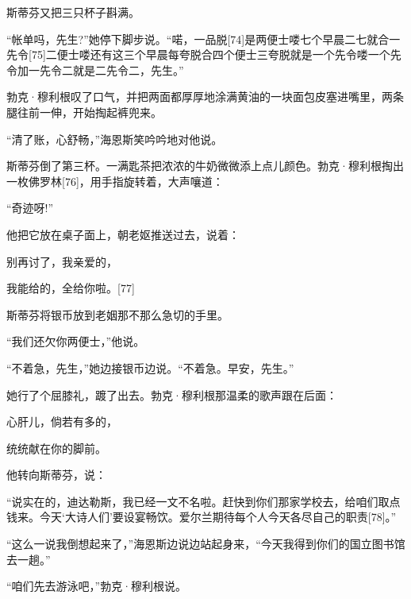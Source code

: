 \documentclass{article}
\begin{document}
斯蒂芬又把三只杯子斟满。



“帐单吗，先生?”她停下脚步说。“喏，一品脱[74]是两便士喽七个早晨二七就合一先令[75]二便士喽还有这三个早晨每夸脱合四个便士三夸脱就是一个先令喽一个先令加一先令二就是二先令二，先生。”



勃克·穆利根叹了口气，并把两面都厚厚地涂满黄油的一块面包皮塞进嘴里，两条腿往前一伸，开始掏起裤兜来。



“清了账，心舒畅，”海恩斯笑吟吟地对他说。



斯蒂芬倒了第三杯。一满匙茶把浓浓的牛奶微微添上点儿颜色。勃克·穆利根掏出一枚佛罗林[76]，用手指旋转着，大声嚷道：



“奇迹呀!”



他把它放在桌子面上，朝老妪推送过去，说着：



别再讨了，我亲爱的，



我能给的，全给你啦。[77]



斯蒂芬将银币放到老姻那不那么急切的手里。



“我们还欠你两便士，”他说。



“不着急，先生，”她边接银币边说。“不着急。早安，先生。”



她行了个屈膝礼，踱了出去。勃克·穆利根那温柔的歌声跟在后面：



心肝儿，倘若有多的，



统统献在你的脚前。



他转向斯蒂芬，说：



“说实在的，迪达勒斯，我已经一文不名啦。赶快到你们那家学校去，给咱们取点钱来。今天‘大诗人们’要设宴畅饮。爱尔兰期待每个人今天各尽自己的职责[78]。”



“这么一说我倒想起来了，”海恩斯边说边站起身来，“今天我得到你们的国立图书馆去一趟。”



“咱们先去游泳吧，”勃克·穆利根说。
\end{document}
